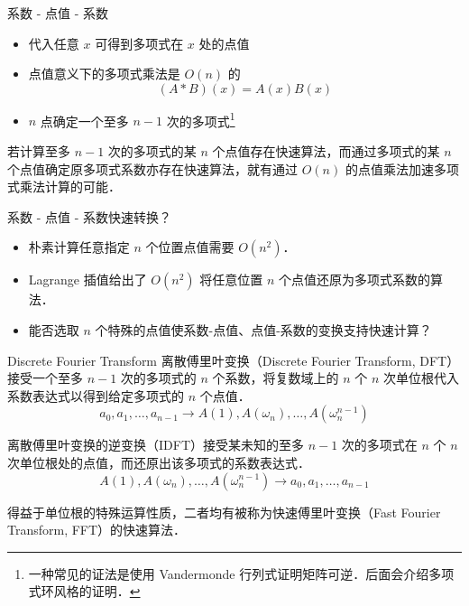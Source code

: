 \documentclass[fontset=fandol]{ctexbeamer}
\begin{document}
\begin{frame}{系数 - 点值 - 系数}
    \begin{itemize}
        \item 代入任意 $x$ 可得到多项式在 $x$ 处的点值
        \item 点值意义下的多项式乘法是 $O(n)$ 的
        \[
        (A*B)(x) = A(x)B(x)
        \]
        \item $n$ 点确定一个至多 $n-1$ 次的多项式\footnote{一种常见的证法是使用 Vandermonde 行列式证明矩阵可逆．后面会介绍多项式环风格的证明．}
    \end{itemize}
    
    若计算至多 $n-1$ 次的多项式的某 $n$ 个点值存在快速算法，而通过多项式的某 $n$ 个点值确定原多项式系数亦存在快速算法，就有通过 $O(n)$ 的点值乘法加速多项式乘法计算的可能．
\end{frame}

\begin{frame}{系数 - 点值 - 系数}{快速转换？}
    \begin{itemize}
        \item 朴素计算任意指定 $n$ 个位置点值需要 $O(n^2)$．
        \item Lagrange 插值给出了 $O(n^2)$ 将任意位置 $n$ 个点值还原为多项式系数的算法．
        \item 能否选取 $n$ 个特殊的点值使系数-点值、点值-系数的变换支持快速计算？
    \end{itemize}

\end{frame}

\begin{frame}{Discrete Fourier Transform}
    离散傅里叶变换（Discrete Fourier Transform, DFT）接受一个至多 $n-1$ 次的多项式的 $n$ 个系数，将复数域上的 $n$ 个 $n$ 次单位根代入系数表达式以得到给定多项式的 $n$ 个点值．
    \[ a_0,a_1,\dots,a_{n-1} \longrightarrow A(1),A(\omega_n),\dots,A(\omega_n^{n-1}) \]

    离散傅里叶变换的逆变换（IDFT）接受某未知的至多 $n-1$ 次的多项式在 $n$ 个 $n$ 次单位根处的点值，而还原出该多项式的系数表达式．
    \[ A(1),A(\omega_n),\dots,A(\omega_n^{n-1}) \longrightarrow a_0,a_1,\dots,a_{n-1} \]
    
    得益于单位根的特殊运算性质，二者均有被称为快速傅里叶变换（Fast Fourier Transform, FFT）的快速算法．
\end{frame}
\end{document}
